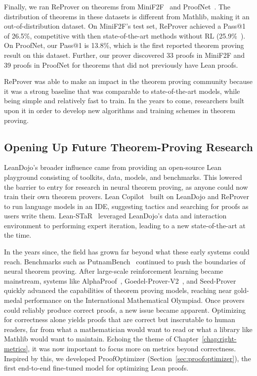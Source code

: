 Finally, we ran ReProver on theorems from MiniF2F~\citep{zheng2022minif2f} and
ProofNet~\citep{azerbayev2023proofnet}. The distribution of theorems in these datasets
is different from Mathlib, making it an out-of-distribution dataset.
On MiniF2F's test set, ReProver achieved a Pass@1 of 26.5\%, competitive with then state-of-the-art methods without
RL (25.9\%~\citep{polu2023formal}). On ProofNet, our Pass@1 is 13.8\%, which
is the first reported theorem proving result on this dataset. Further, our
prover discovered 33 proofs in MiniF2F and 39 proofs in ProofNet for theorems
that did not previously have Lean proofs.

ReProver was able to make an impact in the theorem proving community because it was a strong
baseline that was comparable to state-of-the-art models, while being simple and relatively fast
to train. In the years to come, researchers built upon it in order to develop new algorithms and training
schemes in theorem proving.

\subsection{Opening Up Future Theorem-Proving Research}
LeanDojo's broader influence came from providing an open-source Lean playground
consisting of toolkits, data, models, and benchmarks. This lowered the barrier to entry
for research in neural theorem proving, as anyone could now train their own theorem provers.
Lean Copilot~\citep{song2024towards} built on LeanDojo and ReProver to run
language models in an IDE, suggesting tactics and searching for proofs as users write them. Lean-STaR~\citep{lin2024lean} leveraged LeanDojo's
data and interaction environment to performing expert iteration, leading to a new state-of-the-art
at the time.

In the years since, the field has grown far beyond what these early systems
could reach. Benchmarks such as PutnamBench~\citep{tsoukalas2024putnambench}
continued to push the boundaries of neural theorem proving. After large-scale reinforcement
learning became mainstream, systems like AlphaProof~\citep{deepmindalphaproof},
Goedel-Prover-V2~\citep{lin2025goedel2}, and Seed-Prover~\citep{chen2507seed}
quickly advanced the capabilities of theorem proving models, reaching near
gold-medal performance on the International Mathematical Olympiad. Once provers
could reliably produce correct proofs, a new issue became apparent. Optimizing for
correctness alone yields proofs that are correct but inscrutable to human readers,
far from what a mathematician would want to read or what a library like Mathlib would
want to maintain. Echoing the theme of Chapter~\ref{chap:right-metrics}, it was now important
to focus more on metrics beyond correctness. Inspired by this, we developed ProofOptimizer
(Section~\ref{sec:proofoptimizer}), the first end-to-end fine-tuned model for optimizing
Lean proofs.
